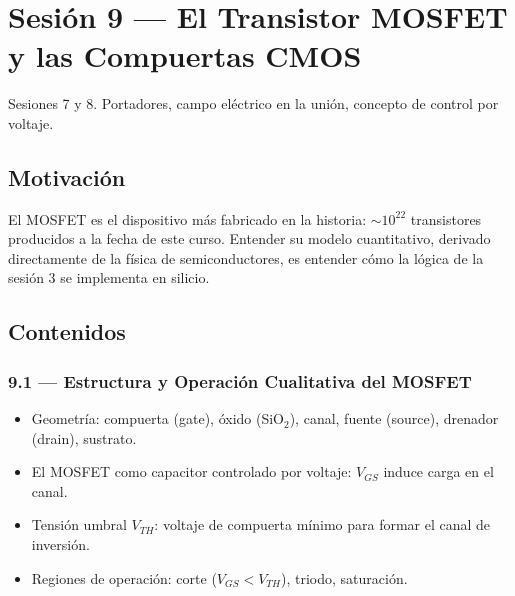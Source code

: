 \documentclass[11pt, letterpaper]{article}
\begin{document}
\newpage

\section{Sesión 9 — El Transistor MOSFET y las Compuertas CMOS}

\begin{prereqs}
Sesiones 7 y 8. Portadores, campo eléctrico en la unión, concepto de control por voltaje.
\end{prereqs}

\subsection*{Motivación}
El MOSFET es el dispositivo más fabricado en la historia: $\sim 10^{22}$ transistores producidos a la fecha de este curso. Entender su modelo cuantitativo, derivado directamente de la física de semiconductores, es entender cómo la lógica de la sesión 3 se implementa en silicio.

\subsection{Contenidos}

\subsubsection{9.1 — Estructura y Operación Cualitativa del MOSFET}
\begin{itemize}
  \item Geometría: compuerta (gate), óxido (SiO$_2$), canal, fuente (source), drenador (drain), sustrato.
  \item El MOSFET como capacitor controlado por voltaje: $V_{GS}$ induce carga en el canal.
  \item Tensión umbral $V_{TH}$: voltaje de compuerta mínimo para formar el canal de inversión.
  \item Regiones de operación: corte ($V_{GS}<V_{TH}$), triodo, saturación.
\end{itemize}
\end{document}
